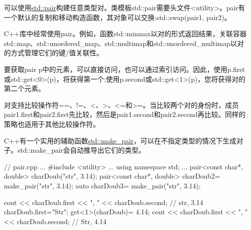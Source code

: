 可以使用\href{http://en.cppreference.com/w/cpp/utility/pair}{std::pair}构建任意类型对。类模板std::pair需要头文件<utility>。pair有一个默认的复制和移动构造函数，其对象可以交换:std::swap(pair1, pair2)。

C++库中经常使用pair。例如，函数std::minmax以对的形式返回结果，关联容器std::map、std::unordered\_map、std::multimap和std::unordered\_multimap以对的方式管理它们的键/值关联性。

要获取pair p中的元素，可以直接访问，也可以通过索引访问。因此，使用p.first或std::get<0>(p)，将获得第一个;使用p.second或std::get<1>(p)，您将获得对的第二个元素。

对支持比较操作符==、!=、<、>、<=和>=。当比较两个对的身份时，成员pair1.first和pair2.first先比较，然后是pair1.second和pair2.second再比较。同样的策略也适用于其他比较操作符。


C++有一个实用的辅助函数\href{http://en.cppreference.com/w/cpp/utility/pair/make_pair}{std::make\_pair}，可以在不指定类型的情况下生成对子。std::make\_pair会自动推导出它们的类型。


\begin{cpp}
// pair.cpp
...
#include <utility>
...
using namespace std;
...
pair<const char*, double> charDoub("str", 3.14);
pair<const char*, double> charDoub2= make_pair("str", 3.14);
auto charDoub3= make_pair("str", 3.14);

cout << charDoub.first << ", " << charDoub.second; // str, 3.14
charDoub.first="Str";
get<1>(charDoub)= 4.14;
cout << charDoub.first << ", " << charDoub.second; // Str, 4.14
\end{cpp}
































